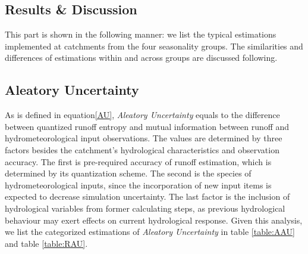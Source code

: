 \documentclass[11pt]{article}
\begin{document}
 
\newpage
\begin{center}
\section{Results \& Discussion}
\end{center}

This part is shown in the following manner: we list the typical estimations implemented at catchments from the four  seasonality groups. The similarities and differences of estimations within and across groups are discussed following.      
\\
\subsection{Aleatory Uncertainty}
As is defined in equation\eqref{AU}, \emph{Aleatory Uncertainty} equals to the difference between quantized runoff entropy and  mutual information between runoff and hydrometeorological input observations. The values are determined by three factors besides the catchment's hydrological characteristics and observation accuracy. The first is pre-required accuracy of runoff estimation, which is determined by its quantization scheme. The second is the species of hydrometeorological inputs, since the incorporation of new input items is expected to decrease simulation uncertainty. The last factor is the inclusion of hydrological variables from former calculating steps, as previous hydrological behaviour may exert effects on current hydrological response. Given this analysis, we list the categorized estimations of \emph{Aleatory Uncertainty} in table  \ref{table:AAU} and table \ref{table:RAU}. 
\end{document}
